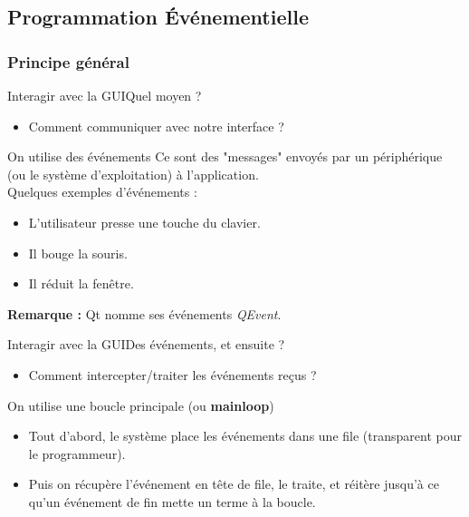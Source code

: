 \documentclass[12pt]{beamer}
\begin{document}
    
    \subsection{Programmation Événementielle}
        \subsubsection{Principe général}
            \begin{frame}{Interagir avec la GUI}{Quel moyen ?}
                \begin{itemize}
                    \item{Comment communiquer avec notre interface ?}
                \end{itemize}
                \begin{block}{On utilise des événements}
                        Ce sont des "messages" envoyés par un périphérique (ou le système d'exploitation) à l'application. \\Quelques exemples d'événements :
                        \begin{itemize}
                            \item{L'utilisateur presse une touche du clavier.}
                            \item{Il bouge la souris.}
                            \item{Il réduit la fenêtre.}
                        \end{itemize}
                        \textbf{Remarque :} Qt nomme ses événements \textit{QEvent}.
                    \end{block}
                \end{frame}
        
                \begin{frame}{Interagir avec la GUI}{Des événements, et ensuite ? }
                    \begin{itemize}
                        \item{Comment intercepter/traiter les événements reçus ?}
                    \end{itemize}
                    \begin{block}{On utilise une boucle principale (ou \textbf{mainloop})}
                        \begin{itemize}
                            \item{Tout d'abord, le système place les événements dans une file (transparent pour le programmeur).}
                            \item{Puis on récupère l'événement en tête de file, le traite, et réitère jusqu'à ce qu'un événement de fin mette un terme à la boucle.}
                        \end{itemize}
                    \end{block}
                \end{frame}
                
\end{document}

